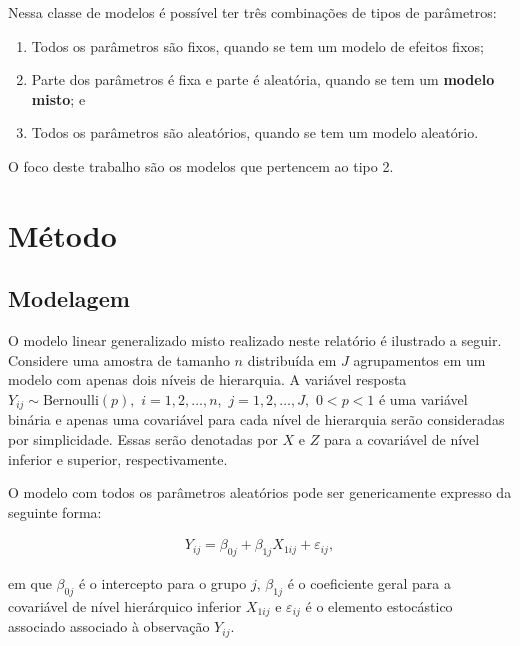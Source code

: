 \documentclass[
  letterpaper,
  DIV=11,
  numbers=noendperiod]{scrartcl}
\providecommand{\tightlist}{%
  \setlength{\itemsep}{0pt}\setlength{\parskip}{0pt}}\usepackage{longtable,booktabs,array}
\begin{document}
Nessa classe de modelos é possível ter três combinações de tipos de
parâmetros:

\begin{enumerate}
\def\labelenumi{\arabic{enumi}.}
\tightlist
\item
  Todos os parâmetros são fixos, quando se tem um modelo de efeitos
  fixos;
\item
  Parte dos parâmetros é fixa e parte é aleatória, quando se tem um
  \textbf{modelo misto}; e
\item
  Todos os parâmetros são aleatórios, quando se tem um modelo aleatório.
\end{enumerate}

O foco deste trabalho são os modelos que pertencem ao tipo 2.

\newpage{}

\hypertarget{muxe9todo}{%
\section{Método}\label{muxe9todo}}

\hypertarget{modelagem}{%
\subsection{Modelagem}\label{modelagem}}

O modelo linear generalizado misto realizado neste relatório é ilustrado
a seguir. Considere uma amostra de tamanho \(n\) distribuída em \(J\)
agrupamentos em um modelo com apenas dois níveis de hierarquia. A
variável resposta
\(Y_{ij} \sim \text{Bernoulli}(p), \,\, i = 1, 2, \dots, n, \,\, j = 1, 2, \dots, J, \,\, 0 < p < 1\)
é uma variável binária e apenas uma covariável para cada nível de
hierarquia serão consideradas por simplicidade. Essas serão denotadas
por \(X\) e \(Z\) para a covariável de nível inferior e superior,
respectivamente.

O modelo com todos os parâmetros aleatórios pode ser genericamente
expresso da seguinte forma:

\begin{align}
  Y_{ij} = \beta_{0j} + \beta_{1j}X_{1ij} + \varepsilon_{ij}, \label{01}
\end{align}

em que \(\beta_{0j}\) é o intercepto para o grupo \(j\), \(\beta_{1j}\)
é o coeficiente geral para a covariável de nível hierárquico inferior
\(X_{1ij}\) e \(\varepsilon_{ij}\) é o elemento estocástico associado
associado à observação \(Y_{ij}\).
\end{document}
